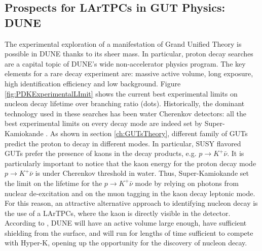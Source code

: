 \subsection{Prospects for LArTPCs in GUT Physics: DUNE}\label{ch:GutsLAr}
The experimental exploration of a manifestation of Grand Unified Theory is possible in DUNE thanks to its sheer mass.  In particular, proton decay searches are a capital topic of DUNE's wide non-accelerator physics program.
The key elements for a rare decay experiment are: massive active volume, long exposure, high identification efficiency and low background. 
Figure \ref{fig:PDKExperimentalLImit} shows the current best experimental limits on nucleon decay lifetime over branching ratio (dots). Historically, the dominant technology used in these searches has been water Cherenkov detectors: all the best experimental limits on every decay mode are indeed set by Super-Kamiokande \cite{PhysRevD.90.072005,PhysRevLett.115.121803}.  As shown in section \ref{ch:GUTsTheory}, different family of GUTs predict the proton to decay in different modes. In particular, SUSY flavored GUTs prefer the presence of kaons in the decay products, e.g. $p \rightarrow K^+ \bar{\nu}$.
It is particularly important to notice that the kaon energy for the proton decay mode $p \rightarrow K^+ \bar{\nu}$ is under Cherenkov threshold in water.  Thus, Super-Kamiokande set the limit on the lifetime for the $p \rightarrow K^+ \bar{\nu}$ mode by  relying  on photons from nuclear de-excitation and on the muon tagging in the kaon decay leptonic mode. For this reason, an attractive alternative approach to identifying nucleon decay is the use of a LArTPCs, where the kaon is directly visible in the detector. 
According to \cite{Adams:2013qkq}, DUNE will have an active volume large enough, have sufficient shielding from the surface, and will run for lengths of time sufficient to compete with Hyper-K, opening up the opportunity for the discovery of nucleon decay. 

